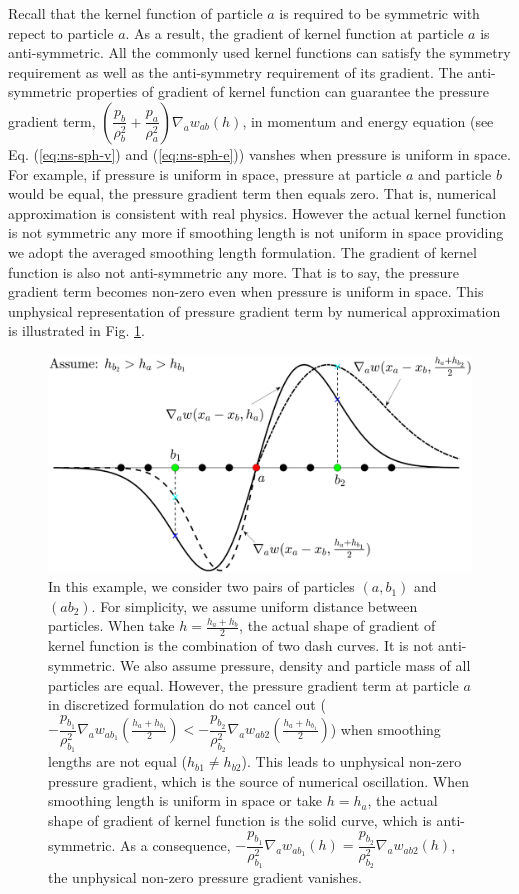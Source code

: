\documentclass[review]{elsarticle}
\begin{document}
Recall that the kernel function of particle $a$ is required to be symmetric with repect to particle $a$. As a result, the gradient of kernel function at particle $a$ is anti-symmetric. All the commonly used kernel functions can satisfy the symmetry requirement as well as the anti-symmetry requirement of its gradient. The anti-symmetric properties of gradient of kernel function can guarantee the pressure gradient term, $\left(\dfrac{p_b}{\rho_b^2} + \dfrac{p_a}{\rho_a^2}\right) \nabla_a w_{a b}\left(h\right)$,  in momentum and energy equation (see Eq. (\ref{eq:ns-sph-v}) and (\ref{eq:ns-sph-e})) vanshes when pressure is uniform in space. For example, if pressure is uniform in space, pressure at particle $a$ and particle $b$ would be equal, the pressure gradient term then equals zero. That is, numerical approximation is consistent with real physics. However the actual kernel function is not symmetric any more if smoothing length is not uniform in space providing we adopt the averaged smoothing length formulation. The gradient of kernel function is also not anti-symmetric any more. That is to say, the pressure gradient term becomes non-zero even when pressure is uniform in space. This unphysical representation of pressure gradient term by numerical approximation is illustrated in Fig. \ref{fig:dw-ha}. 

\begin{figure}[H]
\centering
\includegraphics[width=0.90 \textwidth ]{App-Figure/dw-ha}
\caption{In this example, we consider two pairs of particles $(a, b_1)$ and $(a b_2)$. For simplicity, we assume uniform distance between particles. When take $h=\frac{h_a + h_b}{2}$, the actual shape of gradient of kernel function is the combination of two dash curves. It is not anti-symmetric.
We also assume pressure, density and particle mass of all particles are equal. However, the pressure gradient term at particle $a$ in discretized formulation do not cancel out ( $-\dfrac{p_{b_1}}{\rho_{b_1}^2} \nabla_a w_{a b_1}\left(\frac{h_a+h_{b_1}}{2}\right) < -\dfrac{p_{b_2}}{\rho_{b_2}^2} \nabla_a w_{a b2}\left(\frac{h_a+h_{b_1}}{2}\right)$) when smoothing lengths are not equal ($h_{b1} \neq h_{b2}$). This leads to unphysical non-zero pressure gradient, which is the source of numerical oscillation. When smoothing length is uniform in space or take $h = h_a$, the actual shape of gradient of kernel function is the solid curve, which is anti-symmetric. As a consequence, $-\dfrac{p_{b_1}}{\rho_{b_1}^2} \nabla_a w_{a b_1}\left(h\right) = \dfrac{p_{b_2}}{\rho_{b_2}^2} \nabla_a w_{a b2}\left(h\right)$, the unphysical non-zero pressure gradient vanishes.}    
\label{fig:dw-ha}
\end{figure}
\end{document}
